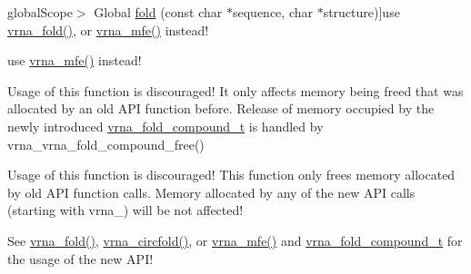 \begin{DoxyRefList}
\hypertarget{deprecated__deprecated000064}{}%
global\+Scope$>$ Global \hyperlink{group__mfe__fold__single_gaadafcb0f140795ae62e5ca027e335a9b}{fold} (const char $\ast$sequence, char $\ast$structure)]use \hyperlink{group__mfe__fold__single_gae7ca49ffb3086f145da36c964a7cec64}{vrna\+\_\+fold()}, or \hyperlink{group__mfe__fold_gabd3b147371ccf25c577f88bbbaf159fd}{vrna\+\_\+mfe()} instead! 
\item[\label{deprecated__deprecated000063}%
\hypertarget{deprecated__deprecated000063}{}%
global\+Scope$>$ Global \hyperlink{group__mfe__fold__single_ga2bc41df5d71fee6fd8da9904ee65d8fb}{fold\+\_\+par} (const char $\ast$sequence, char $\ast$structure, vrna\+\_\+param\+\_\+t $\ast$parameters, int is\+\_\+constrained, int is\+\_\+circular)]use \hyperlink{group__mfe__fold_gabd3b147371ccf25c577f88bbbaf159fd}{vrna\+\_\+mfe()} instead! 
\item[\label{deprecated__deprecated000014}%
\hypertarget{deprecated__deprecated000014}{}%
global\+Scope$>$ Global \hyperlink{group__consensus__mfe__fold_ga72095e4554b5d577250ea14c42acc49e}{free\+\_\+alifold\+\_\+arrays} (void)]Usage of this function is discouraged! It only affects memory being free\textquotesingle{}d that was allocated by an old A\+P\+I function before. Release of memory occupied by the newly introduced \hyperlink{group__fold__compound_ga1b0cef17fd40466cef5968eaeeff6166}{vrna\+\_\+fold\+\_\+compound\+\_\+t} is handled by vrna\+\_\+vrna\+\_\+fold\+\_\+compound\+\_\+free() 
\item[\label{deprecated__deprecated000022}%
\hypertarget{deprecated__deprecated000022}{}%
global\+Scope$>$ Global \hyperlink{group__consensus__pf__fold_ga0c0498f35686e26b38ee460d3db1a661}{free\+\_\+alipf\+\_\+arrays} (void)]Usage of this function is discouraged! This function only free\textquotesingle{}s memory allocated by old A\+P\+I function calls. Memory allocated by any of the new A\+P\+I calls (starting with vrna\+\_\+) will be not affected! 
\item[\label{deprecated__deprecated000066}%
\hypertarget{deprecated__deprecated000066}{}%
global\+Scope$>$ Global \hyperlink{group__mfe__fold__single_ga107fdfe5fd641868156bfd849f6866c7}{free\+\_\+arrays} (void)]See \hyperlink{group__mfe__fold__single_gae7ca49ffb3086f145da36c964a7cec64}{vrna\+\_\+fold()}, \hyperlink{group__mfe__fold__single_gaa0f5bf321038f404b36a6147bdae4154}{vrna\+\_\+circfold()}, or \hyperlink{group__mfe__fold_gabd3b147371ccf25c577f88bbbaf159fd}{vrna\+\_\+mfe()} and \hyperlink{group__fold__compound_ga1b0cef17fd40466cef5968eaeeff6166}{vrna\+\_\+fold\+\_\+compound\+\_\+t} for the usage of the new A\+P\+I! 

\end{DoxyRefList}
